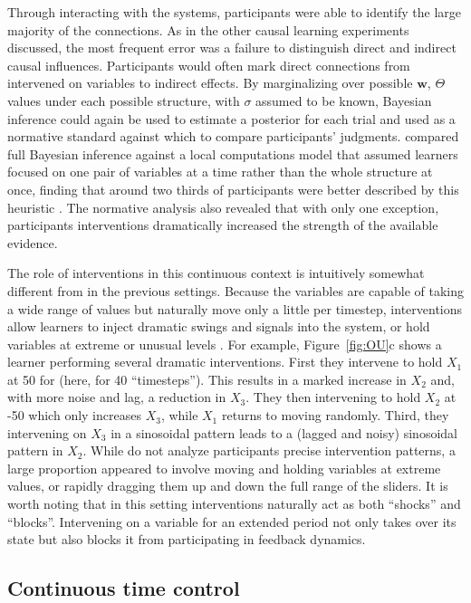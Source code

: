 \documentclass{cambridge7A}%
\newcommand{\ww}{\mathbf{w}} %
\begin{document}
Through interacting with the systems, participants were able to identify the large majority of the connections.  As in the other causal learning experiments discussed, the most frequent error was a failure to distinguish direct and indirect causal influences.  Participants would often mark direct connections from intervened on variables to indirect effects.  By marginalizing over possible $\ww$, $\Theta$ values under each possible structure, with $\sigma$ assumed to be known, Bayesian inference could again be used to estimate a posterior for each trial and used as a normative standard against which to compare participants' judgments.  \cite{davis2018ctcv} compared full Bayesian inference against a local computations model that assumed learners focused on one pair of variables at a time rather than the whole structure at once, finding that around two thirds of participants were better described by this heuristic \citep[cf][]{fernbach2009causal}.  The normative analysis also revealed that with only one exception, participants interventions dramatically increased the strength of the available evidence.

The role of interventions in this continuous context is intuitively somewhat different from in the previous settings.  Because the variables are capable of taking a wide range of values but naturally move only a little per timestep, interventions allow learners to inject dramatic swings and signals into the system, or hold variables at extreme or unusual levels \citep[Figure~\ref{fig:OU},][]{davis2018ctcv}.  For example, Figure~\ref{fig:OU}c shows a learner performing several dramatic interventions.  First they intervene to hold $X_1$ at 50 for (here, for 40 ``timesteps'').  This results in a marked increase in $X_2$ and, with more noise and lag, a reduction in $X_3$.  They then intervening to hold $X_2$ at -50 which only increases $X_3$, while $X_1$ returns to moving randomly.  Third, they intervening on $X_3$ in a sinosoidal pattern leads to a (lagged and noisy) sinosoidal pattern in $X_2$.  While \cite{davis2018ctcv} do not analyze participants precise intervention patterns, a large proportion appeared to involve moving and holding variables at extreme values, or rapidly dragging them up and down the full range of the sliders.  It is worth noting that in this setting interventions naturally act as both ``shocks'' and ``blocks''.  Intervening on a variable for an extended period not only takes over its state but also blocks it from participating in feedback dynamics.

\subsection{Continuous time control}
\end{document}
